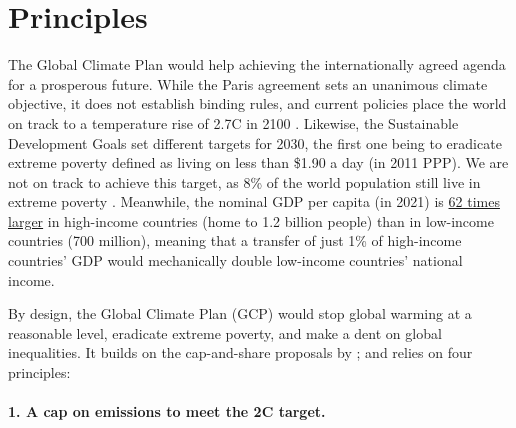 \documentclass[12pt,english]{article}
\begin{document}
\section{Principles}\label{sec:principles}
The Global Climate Plan would help achieving the internationally agreed agenda for a prosperous future. While the Paris agreement sets an unanimous climate objective, it does not establish binding rules, and current policies place the world on track to a temperature rise of 2.7\textdegree{}C in 2100 \citep{climate_action_tracker_warming_2022}. Likewise, the Sustainable Development Goals set different targets for 2030, the first one being to eradicate extreme poverty defined as living on less than \$1.90 a day (in 2011 PPP). %
We are not on track to achieve this target, as 8\% of the world population still live in extreme poverty \citep{un_sustainable_2022}. Meanwhile, the nominal GDP per capita (in 2021) is \href{https://data.worldbank.org/indicator/NY.GDP.PCAP.CD?end=2021&locations=EU-ZG-XD-XM-1W-IN-US-CD-BI-LU-CN&start=2021&view=bar}{62 times larger} in high-income countries (home to 1.2 billion people) than in low-income countries (700 million), meaning that a transfer of just 1\% of high-income countries' GDP would mechanically double low-income countries' national income. 

By design, the Global Climate Plan (GCP) would stop global warming at a reasonable level, eradicate extreme poverty, and make a dent on global inequalities. It builds on the cap-and-share proposals by \citet{grubb_greenhouse_1990}; \citet{feasta_cap_2008} and relies on four principles:
\paragraph*{1. A cap on emissions to meet the 2\textdegree{}C target.} 
\end{document}
